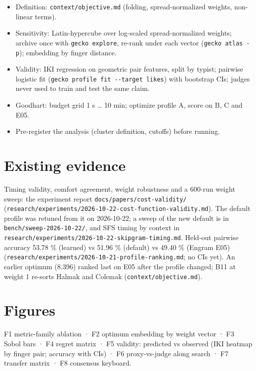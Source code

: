 \documentclass{gecko-paper}
\begin{document}
\begin{paperbody}
\begin{itemize}
\setlength{\itemsep}{1pt}\setlength{\parskip}{0pt}
\item
  Definition: \texttt{context/objective.md} (folding, spread-normalized
  weights, non-linear terms).
\item
  Sensitivity: Latin-hypercube over log-scaled spread-normalized
  weights; archive once with \texttt{gecko\ explore}, re-rank under each
  vector (\texttt{gecko\ atlas\ -p}); embedding by finger distance.
\item
  Validity: IKI regression on geometric pair features, split by typist;
  pairwise logistic fit
  (\texttt{gecko\ profile\ fit\ -\/-target\ likes}) with bootstrap CIs;
  judges never used to train and test the same claim.
\item
  Goodhart: budget grid 1 s \ldots{} 10 min; optimize profile A, score
  on B, C and E05.
\item
  Pre-register the analysis (cluster definition, cutoffs) before
  running.
\end{itemize}

\section{Existing evidence}

Timing validity, comfort agreement, weight robustness and a 600-run
weight sweep: the experiment report \texttt{docs/papers/cost-validity/}
(\texttt{research/experiments/2026-10-22-cost-function-validity.md}).
The default profile was retuned from it on 2026-10-22; a sweep of the
new default is in \texttt{bench/sweep-2026-10-22/}, and SFS timing by
context in \texttt{research/experiments/2026-10-22-skipgram-timing.md}.
Held-out pairwise accuracy 53.78 \% (learned) vs 51.96 \% (default) vs
49.40 \% (Engram E05)
(\texttt{research/experiments/2026-10-21-profile-ranking.md}; no CIs
yet). An earlier optimum (8.396) ranked last on E05 after the profile
changed; B11 at weight 1 re-sorts Halmak and Colemak
(\texttt{context/objective.md}).

\section{Figures}

F1 metric-family ablation · F2 optimum embedding by weight vector · F3
Sobol bars · F4 regret matrix · F5 validity: predicted vs observed (IKI
heatmap by finger pair; accuracy with CIs) · F6 proxy-vs-judge along
search · F7 transfer matrix · F8 consensus keyboard.


\end{paperbody}
\end{document}
